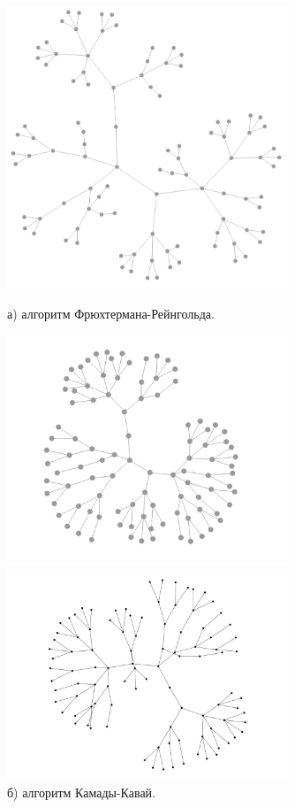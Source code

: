 \documentclass[14pt, russian]{scrartcl}
\begin{document}
\begin{figure}[H]
\centering
  \begin{minipage}[t]{.45\textwidth}
  \centering
\includegraphics[width=0.75\textwidth]{./imgs/fr_quad_tree.png}
  \caption*{а) алгоритм Фрюхтермана-Рейнгольда.}
  \end{minipage}
  \noindent
  \begin{minipage}[t]{.50\textwidth}
  \centering
\includegraphics[width=0.75\textwidth]{./imgs/kk_quad_tree.png}
  \caption*{б) алгоритм Камады-Кавай.}
  \end{minipage}
  \begin{minipage}[t]{.55\textwidth}
  \centering
\includegraphics[width=0.75\textwidth]{./imgs/quad_tree_gv.png}

\end{minipage}
\end{figure}
\end{document}
